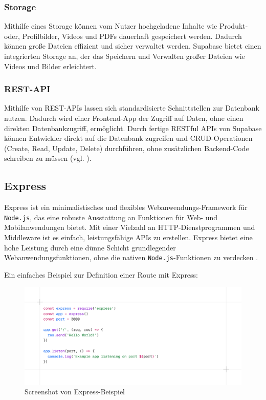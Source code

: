\documentclass[oneside]{ausarbeitung}
\begin{document}
\subsubsection{Storage}
Mithilfe eines Storage können vom Nutzer hochgeladene Inhalte wie Produkt- oder, Profilbilder, Videos und PDFs dauerhaft gespeichert werden. Dadurch können große Dateien effizient und sicher verwaltet werden. 
Supabase bietet einen integrierten Storage an, der das Speichern und Verwalten großer Dateien wie Videos und Bilder erleichtert. 
\subsubsection{REST-API}
Mithilfe von \ac{REST}-\ac{APIs} lassen sich standardisierte Schnittstellen zur Datenbank nutzen. Dadurch wird einer Frontend-App der Zugriff auf Daten, ohne einen direkten Datenbankzugriff, ermöglicht. 
Durch fertige RESTful \ac{APIs} von Supabase können Entwickler direkt auf die Datenbank zugreifen und \ac{CRUD}-Operationen (Create, Read, Update, Delete) durchführen, ohne zusätzlichen Backend-Code schreiben zu müssen (vgl. \parencite{supabase}). 
\subsection{Express}

Express ist ein minimalistisches und flexibles Webanwendungs-Framework für \texttt{Node.js}, das eine robuste Ausstattung an Funktionen für Web- und Mobilanwendungen bietet. Mit einer Vielzahl an \ac{HTTP}-Dienstprogrammen und Middleware ist es einfach, leistungsfähige \ac{APIs} zu erstellen. Express bietet eine hohe Leistung durch eine dünne Schicht grundlegender Webanwendungsfunktionen, ohne die nativen \texttt{Node.js}-Funktionen zu verdecken \parencite{express-official}.  

Ein einfaches Beispiel zur Definition einer Route mit Express:  

\begin{figure}[H]
    \centering
    \includegraphics[width=\linewidth]{images/express.png}
    \caption{Screenshot von Express-Beispiel}
    \label{fig:rcheckout}
\end{figure}
\end{document}
